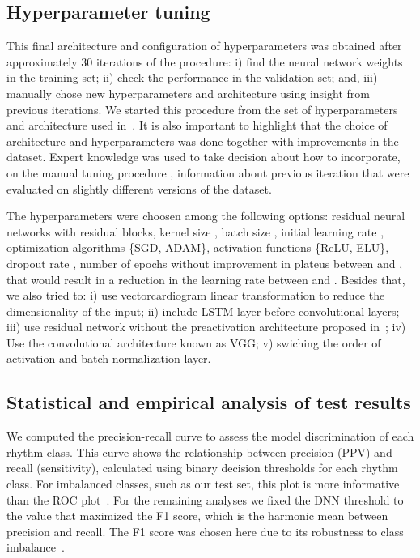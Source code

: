 \documentclass{article}
\begin{document}
\subsection{Hyperparameter tuning}

This final architecture and configuration of hyperparameters was obtained after approximately 30 iterations of the procedure: i) find the neural network weights in the training set; ii) check the performance in the validation set; and, iii) manually chose new hyperparameters and architecture using insight from previous iterations. We started this procedure from the set of hyperparameters and architecture used in~\cite{hannun_cardiologistlevel_2019}. It is also important to highlight that the choice of architecture and hyperparameters was done together with improvements in the dataset. Expert knowledge was used to take decision about how to incorporate, on the manual tuning procedure , information about previous iteration that were evaluated on slightly different versions of the dataset.

The hyperparameters were choosen among the following options: residual neural networks with  residual blocks, kernel size , batch size , initial learning rate , optimization algorithms \{SGD, ADAM\}, activation functions \{ReLU, ELU\}, dropout rate , number of epochs without improvement in plateus between  and , that would result in a reduction in the learning rate between  and . Besides that, we also tried to: i) use vectorcardiogram linear transformation to reduce the dimensionality of the input; ii)  include LSTM layer before convolutional layers; iii) use residual network without the preactivation architecture proposed in~\cite{he_identity_2016}; iv) Use the convolutional architecture known as VGG; v) swiching the order of activation and batch normalization layer.


\subsection{Statistical and empirical analysis of test results}

We computed the precision-recall curve to assess the model discrimination of each rhythm class. This curve shows the relationship between precision (PPV) and recall (sensitivity), calculated using binary decision thresholds for each rhythm class. For imbalanced classes, such as our test set, this plot is more informative than the ROC plot~\cite{saito_precisionrecall_2015}. For the remaining analyses we fixed the DNN threshold to the value that maximized the F1 score, which is the harmonic mean between precision and recall. The F1 score was chosen here due to its robustness to class imbalance~\cite{saito_precisionrecall_2015}.
\end{document}
